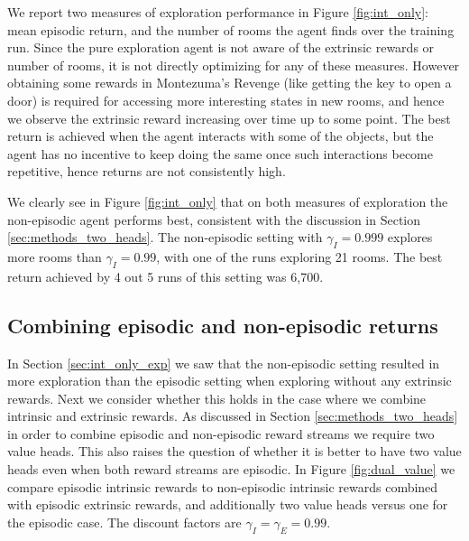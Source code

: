 \documentclass{article} %
\begin{document}
We report two measures of exploration performance in Figure \ref{fig:int_only}: mean episodic return, and the number of rooms the agent finds over the training run. Since the pure exploration agent is not aware of the extrinsic rewards or number of rooms, it is not directly optimizing for any of these measures. However obtaining some rewards in Montezuma's Revenge (like getting the key to open a door) is required for accessing more interesting states in new rooms, and hence we observe the extrinsic reward increasing over time up to some point. The best return is achieved when the agent interacts with some of the objects, but the agent has no incentive to keep doing the same once such interactions become repetitive, hence returns are not consistently high.

We clearly see in Figure \ref{fig:int_only} that on both measures of exploration the non-episodic agent performs best, consistent with the discussion in Section \ref{sec:methods_two_heads}. The non-episodic setting with $\gamma_I = 0.999$ explores more rooms than $\gamma_I = 0.99$, with one of the runs exploring 21 rooms. The best return achieved by 4 out 5 runs of this setting was 6,700. 

\subsection{Combining episodic and non-episodic returns}
\label{sec:exp_episodic}
In Section \ref{sec:int_only_exp} we saw that the non-episodic setting resulted in more exploration than the episodic setting when exploring without any extrinsic rewards. Next we consider whether this holds in the case where we combine intrinsic and extrinsic rewards. As discussed in Section \ref{sec:methods_two_heads} in order to combine episodic and non-episodic reward streams we require two value heads. This also raises the question of whether it is better to have two value heads even when both reward streams are episodic. In Figure \ref{fig:dual_value} we compare episodic intrinsic rewards to non-episodic intrinsic rewards combined with episodic extrinsic rewards, and additionally two value heads versus one for the episodic case. The discount factors are $\gamma_I = \gamma_E = 0.99$.
\end{document}
